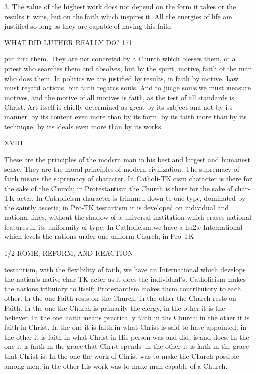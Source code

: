 \documentclass[12pt,a5paper,twoside]{book}
\begin{document}
{3. The value of the highest work does not depend 
on the form it takes or the results it wins, but on the 
faith which inspires it. All the energies of life are 
justified so long as they are capable of having this faith 



WHAT DID LUTHER REALLY DO? 171 

put into them. They are not concreted by a Church 
which blesses them, or a priest who searches them 
and absolves, but by the spirit, motive, faith of the 
man who does them. In politics we are justified by 
results, in faith by motive. Law must regard actions, 
but faith regards souls. And to judge souls we must 
measure motives, and the motive of all motives is faith, 
as the test of all standards is Christ. Art itself is 
chiefly determined as great by its subject and not by 
its manner, by its content even more than by its form, 
by its faith more than by its technique, by its ideals 
even more than by its works. 

XVIII 

These are the principles of the modern man in his 
best and largest and humanest sense. They are the 
moral principles of modern civilization. The supremacy 
of faith means the supremacy of character. In Catholi-TK
cism character is there for the sake of the Church; in 
Protestantism the Church is there for the sake of char-TK
acter. In Catholicism character is trimmed down to 
one type, dominated by the saintly ascetic; in Pro-TK
testantism it is developed on individual and national 
lines, without the shadow of a universal institution 
which erases national features in its uniformity of type. 
In Catholicism we have a hu2:e International which 
levels the nations under one uniform Church; in Pro-TK



1/2 ROME, REFORM, AND REACTION 

testantism, with the flexibility of faith, we have an 
International which develops the nation's native char-TK
acter as it does the individual's. Catholicism makes 
the nations tributary to itself; Protestantism makes 
them contributory to each other. In the one Faith 
rests on the Church, in the other the Church rests on 
Faith. In the one the Church is primarily the clergy, 
in the other it is the believer. In the one Faith means 
practically faith in the Church; in the other it is faith 
in Christ. In the one it is faith in what Christ is said 
to have appointed; in the other it is faith in what 
Christ in His person was and did, is and does. In the 
one it is faith in the grace that Christ spends; in the 
other it is faith in the grace that Christ is. In the one 
the work of Christ was to make the Church possible 
among men; in the other His work was to make man 
capable of a Church. 

}
\end{document}
